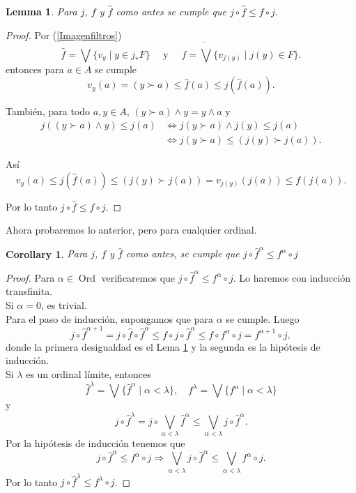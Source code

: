 \documentclass[11pt]{amsart}
\DeclareMathOperator{\Ord}{Ord}
\theoremstyle{plain}
\newtheorem{cor}[thm]{Corollary}
\newtheorem{lem}[thm]{Lemma}
\theoremstyle{definition}
\begin{document}
\begin{lem}\label{f1f}
    Para $j$, $f$ y $\hat{f}$ como antes se cumple que $j\circ \hat{f}\leq f\circ j$.
\end{lem}
\begin{proof}
    Por (\ref{Imagenfiltros})
    \[
    \hat{f}=\dot{\bigvee}\{v_y\mid y\in j_*F\}\quad  \mbox{ y } \quad f=\dot{\bigvee}\{v_{j(y)}\mid j(y)\in F\}. 
    \]
entonces para $a\in A$ se cumple
\[
v_y(a)=(y\succ a)\leq \hat{f}(a)\leq j(\hat{f}(a)).
\]

También, para todo $a, y\in A$, $(y\succ a)\wedge y=y\wedge a$ y
\[
\begin{split}
j((y\succ a)\wedge y)\leq j(a) & \Leftrightarrow j(y\succ a)\wedge j(y)\leq j(a)\\
& \Leftrightarrow j(y\succ a)\leq (j(y)\succ j(a)).
\end{split}
\]

Así 
\[
v_y(a)\leq j(\hat{f}(a))\leq (j(y)\succ j(a))=v_{j(y)}(j(a))\leq f(j(a)).
\]

Por lo tanto $j\circ \hat{f}\leq f\circ j$.
\end{proof}

Ahora probaremos lo anterior, pero para cualquier ordinal.

\begin{cor}\label{finftyf}
    Para $j$, $f$ y $\hat{f}$ como antes, se cumple que $j\circ \hat{f}^\alpha\leq f^\alpha\circ j$
\end{cor}

\begin{proof}
    Para $\alpha\in \Ord$ verificaremos que $j\circ \hat{f}^\alpha\leq f^\alpha\circ j$. Lo haremos con inducción transfinita.\\

    Si $\alpha=0$, es trivial.\\

    Para el paso de inducción, supongamos que para $\alpha$ se cumple. Luego
    \[
    j\circ \hat{f}^{\alpha+1}=j\circ \hat{f}\circ \hat{f}^{\alpha}\leq  f\circ j\circ \hat{f}^\alpha\leq f\circ f^\alpha\circ j=f^{\alpha+1}\circ j,
    \]
    donde la primera desigualdad es el Lema \ref{f1f} y la segunda es la hipótesis de inducción.\\

    Si $\lambda$ es un ordinal límite, entonces
	\[
	\hat{f}^\lambda=\bigvee\{\hat{f}^\alpha\mid \alpha<\lambda\}, \quad f^\lambda=\bigvee\{f^\alpha\mid \alpha<\lambda\} 
	\]
	y
	\[
		j\circ \hat{f}^\lambda=j\circ \bigvee_{\alpha<\lambda}\hat{f}^\alpha\leq\bigvee_{\alpha<\lambda}j\circ \hat{f}^\alpha.
	\]
	Por la hipótesis de inducción tenemos que 
	\[
	j\circ \hat{f}^\alpha\leq f^\alpha\circ j\Rightarrow \bigvee_{\alpha<\lambda}j\circ \hat{f}^\alpha\leq \bigvee_{\alpha<\lambda} f^\alpha\circ j.
	\]
	Por lo tanto $j\circ \hat{f}^\lambda\leq f^\lambda\circ j$.
\end{proof}
\end{document}
